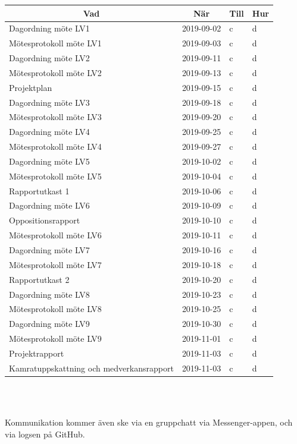 \documentclass[a4paper]{article}
\begin{document}
\begin{tabular}{|l|l|l|l|}
\hline
\multicolumn{1}{c}{\bfseries Vad} & \multicolumn{1}{c}{\bfseries När} & \multicolumn{1}{c}{\bfseries Till} & \multicolumn{1}{c}{\bfseries Hur} \\ \hline
Dagordning möte LV1 & 2019-09-02 & c & d \\ \hline
Mötesprotokoll möte LV1 & 2019-09-03 & c & d \\ \hline

Dagordning möte LV2 & 2019-09-11 & c & d \\ \hline
Mötesprotokoll möte LV2 & 2019-09-13 & c & d \\ \hline

Projektplan & 2019-09-15 & c & d \\ \hline

Dagordning möte LV3 & 2019-09-18 & c & d \\ \hline
Mötesprotokoll möte LV3 & 2019-09-20 & c & d \\ \hline

Dagordning möte LV4 & 2019-09-25 & c & d \\ \hline
Mötesprotokoll möte LV4 & 2019-09-27 & c & d \\ \hline

Dagordning möte LV5 & 2019-10-02 & c & d \\ \hline
Mötesprotokoll möte LV5 & 2019-10-04 & c & d \\ \hline

Rapportutkast 1 & 2019-10-06 & c & d \\ \hline

Dagordning möte LV6 & 2019-10-09 & c & d \\ \hline
Oppositionsrapport & 2019-10-10 & c & d \\ \hline
Mötesprotokoll möte LV6 & 2019-10-11 & c & d \\ \hline

Dagordning möte LV7 & 2019-10-16 & c & d \\ \hline
Mötesprotokoll möte LV7 & 2019-10-18 & c & d \\ \hline
Rapportutkast 2 & 2019-10-20 & c & d \\ \hline

Dagordning möte LV8 & 2019-10-23 & c & d \\ \hline
Mötesprotokoll möte LV8 & 2019-10-25 & c & d \\ \hline

Dagordning möte LV9 & 2019-10-30 & c & d \\ \hline
Mötesprotokoll möte LV9 & 2019-11-01 & c & d \\ \hline
Projektrapport & 2019-11-03 & c & d \\ \hline
Kamratuppskattning och medverkansrapport & 2019-11-03 & c & d \\ \hline

\end{tabular}
\\ \\ \par
Kommunikation kommer även ske via en gruppchatt via Messenger-appen, och via logsen på GitHub.
\end{document}

